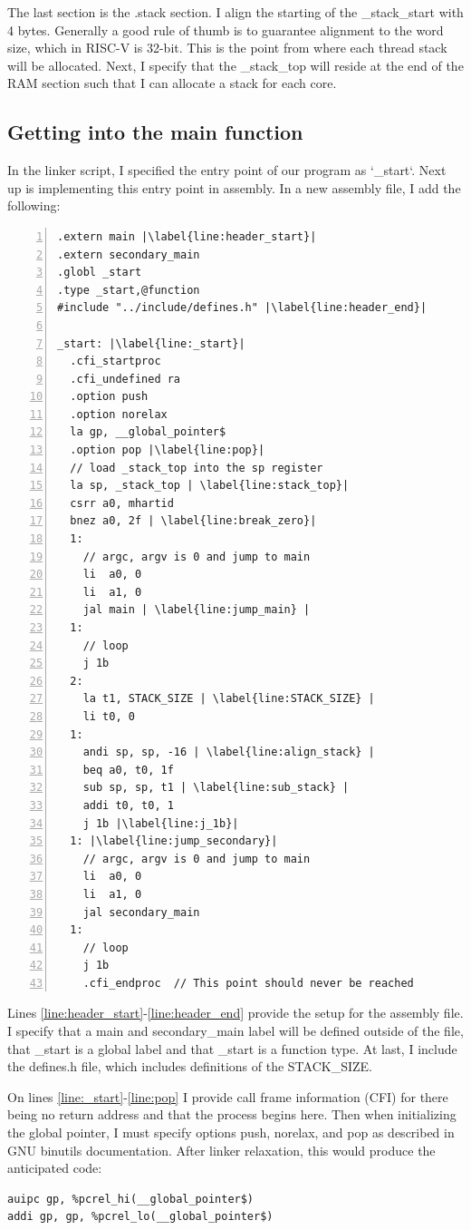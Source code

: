 The last section is the .stack section. I align the starting of the
\_stack\_start with 4 bytes. Generally a good rule of thumb is to guarantee
alignment to the word size, which in RISC-V is 32-bit. This is the point from
where each thread stack will be allocated. Next, I specify that the
\_stack\_top will reside at the end of the RAM section such that I can allocate
a stack for each core.

\subsection{Getting into the main function}\label{sec:get_main}
In the linker script, I specified the entry point of our program as `\_start`.
Next up is implementing this entry point in assembly. In a new assembly file, I
add the following:
\begin{lstlisting}[numbers=left, escapechar=|, caption=Assembly code for getting
to main function.]
.extern main |\label{line:header_start}|
.extern secondary_main
.globl _start
.type _start,@function
#include "../include/defines.h" |\label{line:header_end}|

_start: |\label{line:_start}|
  .cfi_startproc
  .cfi_undefined ra
  .option push
  .option norelax
  la gp, __global_pointer$
  .option pop |\label{line:pop}|
  // load _stack_top into the sp register
  la sp, _stack_top | \label{line:stack_top}|
  csrr a0, mhartid
  bnez a0, 2f | \label{line:break_zero}|
  1:
    // argc, argv is 0 and jump to main
    li  a0, 0
    li  a1, 0
    jal main | \label{line:jump_main} |
  1:
    // loop
    j 1b
  2:
    la t1, STACK_SIZE | \label{line:STACK_SIZE} |
    li t0, 0
  1:
    andi sp, sp, -16 | \label{line:align_stack} |
    beq a0, t0, 1f
    sub sp, sp, t1 | \label{line:sub_stack} |
    addi t0, t0, 1
    j 1b |\label{line:j_1b}|
  1: |\label{line:jump_secondary}|
    // argc, argv is 0 and jump to main
    li  a0, 0
    li  a1, 0
    jal secondary_main
  1:
    // loop
    j 1b
    .cfi_endproc  // This point should never be reached
\end{lstlisting}
Lines \ref{line:header_start}-\ref{line:header_end} provide the setup for the
assembly file. I specify that a main and secondary\_main label will be defined
outside of the file, that \_start is a global label and that \_start is a
function type. At last, I include the defines.h file, which includes
definitions of the STACK\_SIZE.

On lines \ref{line:_start}-\ref{line:pop} I provide call frame information
(CFI) for there being no return address and that the process begins here. Then
when initializing the global pointer, I must specify options push, norelax, and
pop as described in GNU binutils documentation. \cite{GNU_BIN} After linker relaxation, this
would produce the anticipated code:
\begin{lstlisting}
auipc gp, %pcrel_hi(__global_pointer$)
addi gp, gp, %pcrel_lo(__global_pointer$)
\end{lstlisting}

